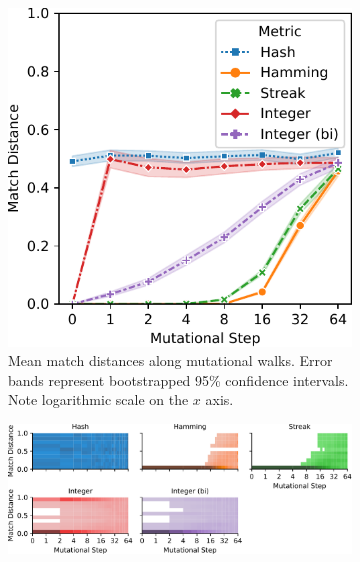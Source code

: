 \begin{figure}[!htbp]
\begin{center}

\begin{subfigure}[b]{\linewidth}
\begin{minipage}{\linewidth}
\centering
\includegraphics[width=0.75\linewidth]{img/mutational_walk/bitweight=0dot5+seed=1+title=mutational_walk_lineplot_ci+_data_hathash_hash=8bf152d87daa9cb7+_script_fullcat_hash=44400a7961ad5f3b+ext=}

\end{minipage}
\begin{minipage}{\linewidth}
\caption{
Mean match distances along mutational walks.
Error bands represent bootstrapped 95\% confidence intervals.
Note logarithmic scale on the $x$ axis.
}
\end{minipage}
\end{subfigure}

\begin{subfigure}[b]{\linewidth}
\begin{minipage}{\linewidth}
\centering
\includegraphics[width=\linewidth]{img/mutational_walk/bitweight=0dot5+seed=1+title=mutational_walk_heatplot+_data_hathash_hash=8bf152d87daa9cb7+_script_fullcat_hash=d91905e1c51705f0+ext=}


\end{minipage}
\end{subfigure}
\end{center}
\end{figure}
